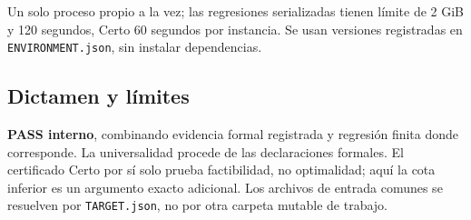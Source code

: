 \documentclass[11pt]{article}
\begin{document}
Un solo proceso propio a la vez; las regresiones serializadas tienen
límite de 2 GiB y 120 segundos, Certo 60 segundos por instancia. Se usan
versiones registradas en \nolinkurl{ENVIRONMENT.json}, sin instalar
dependencias.

\subsection{Dictamen y límites}\label{dictamen-y-luxedmites}

\textbf{PASS interno}, combinando evidencia formal registrada y
regresión finita donde corresponde. La universalidad procede de las
declaraciones formales. El certificado Certo por sí solo prueba
factibilidad, no optimalidad; aquí la cota inferior es un argumento
exacto adicional. Los archivos de entrada comunes se resuelven por
\nolinkurl{TARGET.json}, no por otra carpeta mutable de trabajo.
\end{document}
